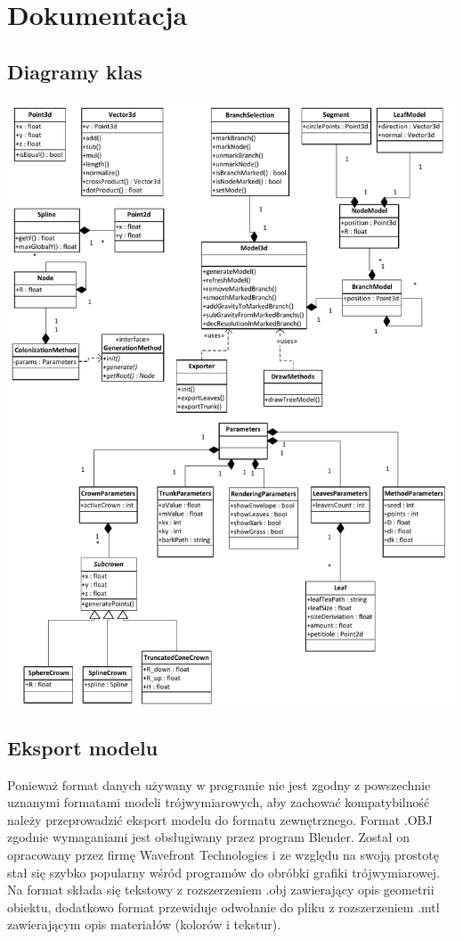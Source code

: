 \chapter{Dokumentacja}

\section{Diagramy klas}

\begin{center}
	\includegraphics[scale=0.55]{images/treemaker_uml}
	\label{treemaker_uml}
\end{center}

\section{Eksport modelu}
Ponieważ format danych używany w programie nie jest zgodny z powszechnie uznanymi formatami modeli trójwymiarowych, aby zachować kompatybilność należy przeprowadzić eksport modelu do 
formatu zewnętrznego. Format .OBJ zgodnie wymaganiami jest obsługiwany przez program Blender.
Został on opracowany przez firmę Wavefront Technologies i ze względu na swoją prostotę stał się szybko
popularny wśród programów do obróbki grafiki trójwymiarowej. Na format składa się tekstowy z rozszerzeniem .obj 
zawierający opis geometrii obiektu, dodatkowo format przewiduje odwołanie do pliku z rozszerzeniem .mtl zawierającym
opis materiałów (kolorów i tekstur).


